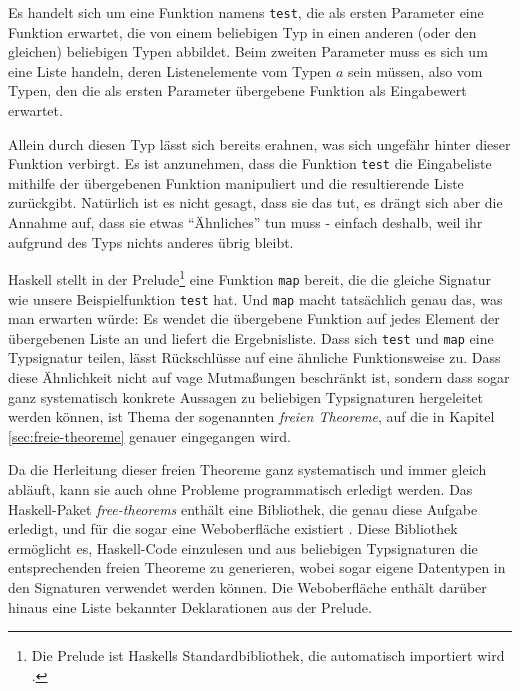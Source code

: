 Es handelt sich um eine Funktion namens \texttt{test}, die als ersten Parameter eine Funktion erwartet, die von einem beliebigen
Typ in einen anderen (oder den gleichen) beliebigen Typen abbildet. Beim zweiten Parameter muss es sich um eine Liste handeln,
deren Listenelemente vom Typen $a$ sein müssen, also vom Typen, den die als ersten Parameter übergebene Funktion als
Eingabewert erwartet.

Allein durch diesen Typ lässt sich bereits erahnen, was sich ungefähr hinter dieser Funktion verbirgt.
Es ist anzunehmen, dass die  Funktion \texttt{test} die Eingabeliste mithilfe der übergebenen Funktion manipuliert und die
resultierende Liste zurückgibt. Natürlich ist es nicht gesagt, dass sie das tut, es drängt sich aber die Annahme auf, dass sie
etwas ``Ähnliches'' tun muss - einfach deshalb, weil ihr aufgrund des Typs nichts anderes übrig bleibt. 

Haskell stellt in der Prelude\footnote{Die Prelude ist Haskells Standardbibliothek, die automatisch importiert wird \cite{haskell}.}
eine Funktion \texttt{map} bereit, die die gleiche Signatur wie unsere Beispielfunktion \texttt{test} hat. Und \texttt{map} macht tatsächlich genau das, was
man erwarten würde: Es wendet die übergebene Funktion auf jedes Element der übergebenen Liste an und liefert die Ergebnisliste.
Dass sich \texttt{test} und
\texttt{map} eine Typsignatur teilen, lässt Rückschlüsse auf eine ähnliche Funktionsweise zu. Dass diese Ähnlichkeit
nicht auf vage Mutmaßungen beschränkt ist, sondern dass sogar ganz systematisch konkrete Aussagen zu beliebigen Typsignaturen
hergeleitet werden können, ist Thema der sogenannten \textit{freien Theoreme}, auf die in Kapitel \ref{sec:freie-theoreme}
genauer eingegangen wird.

Da die Herleitung dieser freien Theoreme ganz systematisch und immer gleich abläuft, kann sie auch ohne Probleme
programmatisch erledigt werden. Das Haskell-Paket \textit{free-theorems} \cite{freetheorems} enthält eine Bibliothek, die
genau diese Aufgabe erledigt, und für die sogar eine Weboberfläche existiert \cite{freetheoremswebui}.
Diese Bibliothek ermöglicht es, Haskell-Code einzulesen und aus beliebigen Typsignaturen die entsprechenden freien
Theoreme zu generieren, wobei sogar eigene Datentypen in den Signaturen verwendet werden können.
Die Web\-ober\-flä\-che enthält darüber hinaus  eine Liste bekannter Deklarationen aus der Prelude.


